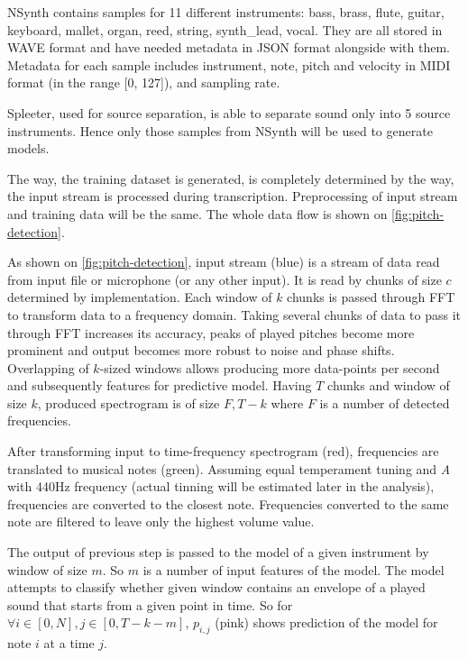 NSynth contains samples for 11 different instruments: bass, brass, flute, guitar, keyboard, mallet, organ, reed,
string, synth\_lead, vocal. They are all stored in \ac{WAVE} format and have needed metadata in JSON format alongside
with them. Metadata for each sample includes instrument, note, pitch and velocity in \ac{MIDI} format (in the range
[0, 127]), and sampling rate.

Spleeter, used for source separation, is able to separate sound only into 5 source instruments. Hence only those samples
from NSynth will be used to generate models.

The way, the training dataset is generated, is completely determined by the way, the input stream is processed during
transcription. Preprocessing of input stream and training data will be the same. The whole data flow is shown
on \cref{fig:pitch-detection}.


As shown on \cref{fig:pitch-detection}, input stream (blue) is a stream of data read from input file or microphone (or
any other input). It is read by chunks of size $c$ determined by implementation. Each window of $k$ chunks is passed
through \ac{FFT} to transform data to a frequency domain. Taking several chunks of data to pass it through \ac{FFT}
increases its accuracy, peaks of played pitches become more prominent and output becomes more robust to noise and phase
shifts. Overlapping of $k$-sized windows allows producing more data-points per second and subsequently features for
predictive model. Having $T$ chunks and window of size $k$, produced spectrogram is of size $F,T-k$ where $F$ is
a number of detected frequencies.

After transforming input to time-frequency spectrogram (red), frequencies are translated to musical notes (green).
Assuming equal temperament tuning and \textit{A} with 440Hz frequency (actual tinning will be estimated later in
the analysis), frequencies are converted to the closest note. Frequencies converted to the same note are filtered
to leave only the highest volume value.

The output of previous step is passed to the model of a given instrument by window of size $m$. So $m$ is a number of
input features of the model. The model attempts to classify whether given window contains an envelope of a played sound
that starts from a given point in time. So for $\forall{i} \in [0,N], j \in [0,T-k-m]$, $p_{i,j}$ (pink) shows
prediction of the model for note $i$ at a time $j$.

